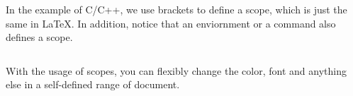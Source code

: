 \begin{frame}[fragile]
	In the example of C/C++, we use brackets \structure{\{\}} to define a scope, which is just the same in \LaTeX. In addition, notice that an enviornment or a command also defines a scope.

	\begin{example}
	\begin{multicols}{2}
		\inputminted{latex}{examples/scope.tex}
		\columnbreak
		
	\end{multicols}
	\end{example}

	With the usage of scopes, you can flexibly change the color, font and anything else in a self-defined range of document.

\end{frame}
